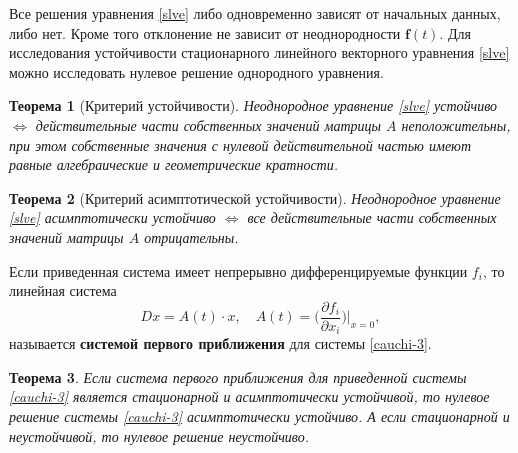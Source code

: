 \documentclass[a4paper, 12pt]{report}
\numberwithin{equation}{section}
\renewcommand{\d}{\partial}
\newtheorem*{theorem}{Теорема}
\begin{document}
	Все решения уравнения \eqref{slve} либо одновременно зависят от начальных данных, либо нет. Кроме того отклонение не зависит от неоднородности $\mathbf f(t)$. Для исследования устойчивости стационарного линейного векторного уравнения \eqref{slve} можно исследовать нулевое решение однородного уравнения.
	\begin{theorem}
		[Критерий устойчивости]
		Неоднородное уравнение \eqref{slve} устойчиво $\Longleftrightarrow$ действительные части собственных значений матрицы $A$ неположительны, при этом собственные значения с нулевой действительной частью имеют равные алгебраические и геометрические кратности.
	\end{theorem}
	\begin{theorem}
		[Критерий асимптотической устойчивости]
		Неоднородное уравнение \eqref{slve} асимптотически устойчиво $\Longleftrightarrow$ все действительные части собственных значений матрицы $A$ отрицательны.
	\end{theorem}
	\noindent
	Если приведенная система имеет непрерывно дифференцируемые функции $f_i$, то линейная система $$Dx = A(t)\cdot x,\quad A(t) = \Big(\dfrac{\d f_i}{\d x_i}\Big)\Big|_{x= 0},$$
	называется \textbf{системой первого приближения} для системы \eqref{cauchi-3}.
	\begin{theorem}
		Если система первого приближения для приведенной системы \eqref{cauchi-3} является стационарной и асимптотически устойчивой, то нулевое решение системы \eqref{cauchi-3} асимптотически устойчиво. А если стационарной и неустойчивой, то нулевое решение неустойчиво.
	\end{theorem}
\end{document}
